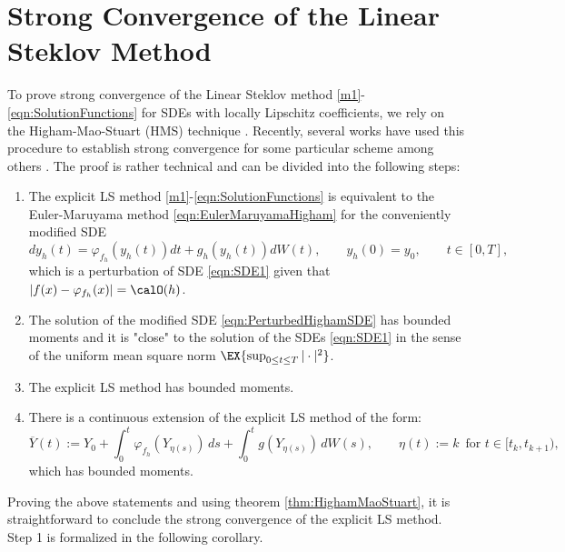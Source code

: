 \documentclass[sort&compress, preprint]{elsarticle}
\theoremstyle{definition}
\theoremstyle{plain}%
\theoremstyle{remark}
\begin{document}
\section{Strong Convergence of the Linear Steklov Method} 


 To prove strong convergence of the Linear Steklov method \eqref{m1}-\eqref{eqn:SolutionFunctions} for  
SDEs with locally Lipschitz coefficients, we rely on the Higham-Mao-Stuart (HMS) technique  
 \cite{Higham2002b}. Recently, several works have used  this  procedure  
 to establish strong convergence for some particular scheme among others \cite{Beyn2010,Guo2014,Hutzenthaler2015,Hutzenthaler2012a,Hutzenthaler2010,Lamba2007,
 Mao2013,Tretyakov2013}. The proof is rather technical and can be divided into the following steps:
 
 \begin{enumerate}[\bf{Step} 1:]
 	\item The explicit LS method \eqref{m1}-\eqref{eqn:SolutionFunctions} is equivalent to 
 	the Euler-Maruyama method \eqref{eqn:EulerMaruyamaHigham} 
	for the conveniently modified SDE
	\begin{equation} \label{eqn:PerturbedHighamSDE}
		dy_h(t)= \varphi_{f_h}(y_h(t))dt +g_h(y_h(t))dW(t),
		\qquad y_h(0)=y_0,  \qquad t\in [0,T],
	\end{equation}
	which is a perturbation of SDE \eqref{eqn:SDE1} given that $|f(x)-\varphi_{f_h}(x)|=\calO(h)$.
	\item\label{stp:PerturbedSolution}
			The solution of the modified SDE \eqref{eqn:PerturbedHighamSDE} has 
			bounded moments and it is 
			"close" to  the solution of the SDEs \eqref{eqn:SDE1}  in the sense of the uniform mean square norm 
			$
				\EX{\sup_{0\leq t\leq T}|\cdot|^2}
			$.
	\item
	\label{stp:MethodBoundedMoments}
		The explicit LS method  has bounded moments.
	\item
		There is a continuous extension of the explicit LS method of the form:
		$$\overline{Y}(t):=Y_0+\int_0^t\varphi_{f_h}(Y_{\eta(s)})\,ds+\int_0^t g(Y_{\eta(s)})\,dW(s), \qquad  
		\eta(t):=k \,\mbox{ for } t\in[t_k,t_{k+1}),$$
		 which has bounded moments.
	\end{enumerate}	
	Proving the above statements and using theorem \ref{thm:HighamMaoStuart},
	it is straightforward to conclude the strong convergence of the explicit LS method. 
	Step 1 is formalized in the following corollary.
	
\end{document}
